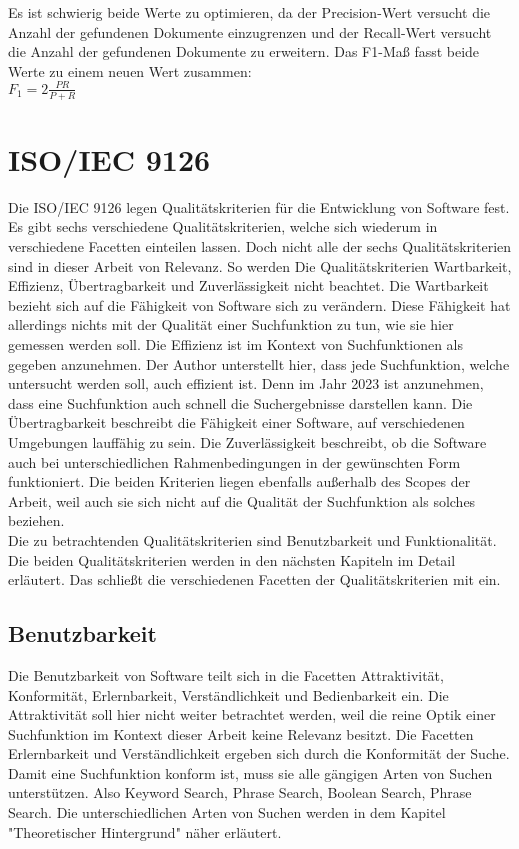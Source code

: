 Es ist schwierig beide Werte zu optimieren, da der Precision-Wert versucht die Anzahl der gefundenen Dokumente einzugrenzen und der Recall-Wert versucht die Anzahl der gefundenen Dokumente zu erweitern.
Das F1-Maß fasst beide Werte zu einem neuen Wert zusammen\cite{Sirotkin_2012}:\\

\(F_1=2\frac{PR}{P+R}\)

\section{ISO/IEC 9126}
Die ISO/IEC 9126 legen Qualitätskriterien für die Entwicklung von Software fest.
Es gibt sechs verschiedene Qualitätskriterien, welche sich wiederum in verschiedene Facetten einteilen lassen.
Doch nicht alle der sechs Qualitätskriterien sind in dieser Arbeit von Relevanz.
So werden Die Qualitätskriterien Wartbarkeit, Effizienz, Übertragbarkeit und Zuverlässigkeit nicht beachtet.
Die Wartbarkeit bezieht sich auf die Fähigkeit von Software sich zu verändern.
Diese Fähigkeit hat allerdings nichts mit der Qualität einer Suchfunktion zu tun, wie sie hier gemessen werden soll.
Die Effizienz ist im Kontext von Suchfunktionen als gegeben anzunehmen.
Der Author unterstellt hier, dass jede Suchfunktion, welche untersucht werden soll, auch effizient ist.
Denn im Jahr 2023 ist anzunehmen, dass eine Suchfunktion auch schnell die Suchergebnisse darstellen kann.
Die Übertragbarkeit beschreibt die Fähigkeit einer Software, auf verschiedenen Umgebungen lauffähig zu sein.
Die Zuverlässigkeit beschreibt, ob die Software auch bei unterschiedlichen Rahmenbedingungen in der gewünschten Form funktioniert.
Die beiden Kriterien liegen ebenfalls außerhalb des Scopes der Arbeit, weil auch sie sich nicht auf die Qualität der Suchfunktion als solches beziehen.\\

Die zu betrachtenden Qualitätskriterien sind Benutzbarkeit und Funktionalität.
Die beiden Qualitätskriterien werden in den nächsten Kapiteln im Detail erläutert.
Das schließt die verschiedenen Facetten der Qualitätskriterien mit ein.

\subsection{Benutzbarkeit}
Die Benutzbarkeit von Software teilt sich in die Facetten Attraktivität, Konformität, Erlernbarkeit, Verständlichkeit und Bedienbarkeit ein.
Die Attraktivität soll hier nicht weiter betrachtet werden, weil die reine Optik einer Suchfunktion im Kontext dieser Arbeit keine Relevanz besitzt.
Die Facetten Erlernbarkeit und Verständlichkeit ergeben sich durch die Konformität der Suche.
Damit eine Suchfunktion konform ist, muss sie alle gängigen Arten von Suchen unterstützen.
Also Keyword Search, Phrase Search, Boolean Search, Phrase Search.
Die unterschiedlichen Arten von Suchen werden in dem Kapitel "Theoretischer Hintergrund" näher erläutert.\\

